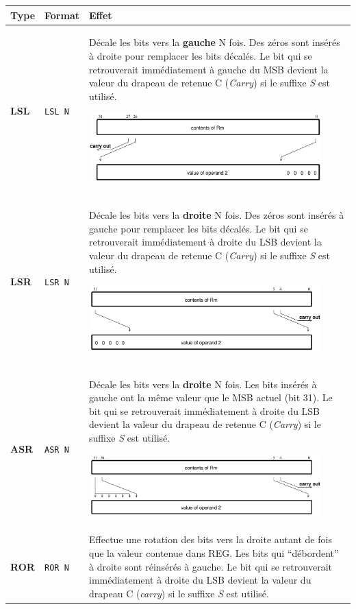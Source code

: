 \documentclass{tufte-handout}
\begin{document}
\begin{table}
\begin{tabular}{l|l|p{13.5cm}}
Type & Format & Effet \\ \hline
\textbf{LSL} & \texttt{LSL N} & Décale les bits vers la \textbf{gauche} N fois. Des zéros sont insérés à droite pour remplacer les bits décalés. Le bit qui se retrouverait immédiatement à gauche du MSB devient la valeur du drapeau de retenue C (\textit{Carry}) si le suffixe \textit{S} est utilisé.

\includegraphics[width=9cm]{pics/lsl.png} \\  \hline

\textbf{LSR} & \texttt{LSR N} & Décale les bits vers la \textbf{droite} N fois. Des zéros sont insérés à gauche pour remplacer les bits décalés. Le bit qui se retrouverait immédiatement à droite du LSB devient la valeur du drapeau de retenue C (\textit{Carry}) si le suffixe \textit{S} est utilisé.

\includegraphics[width=9cm]{pics/lsr.png} \\  \hline

\textbf{ASR} & \texttt{ASR N} & Décale les bits vers la \textbf{droite} N fois. Les bits insérés à gauche ont la même valeur que le MSB actuel (bit 31). Le bit qui se retrouverait immédiatement à droite du LSB devient la valeur du drapeau de retenue C (\textit{Carry}) si le suffixe \textit{S} est utilisé.

\includegraphics[width=9cm]{pics/asr.png} \\  \hline

\textbf{ROR} & \texttt{ROR N} & Effectue une rotation des bits vers la droite autant de fois que la valeur contenue dans REG. Les bits qui ``débordent'' à droite sont réinsérés à gauche. Le bit qui se retrouverait immédiatement à droite du LSB devient la valeur du drapeau C (\textit{carry}) si le suffixe \textit{S} est utilisé.


\end{tabular}
\end{table}
\end{document}
